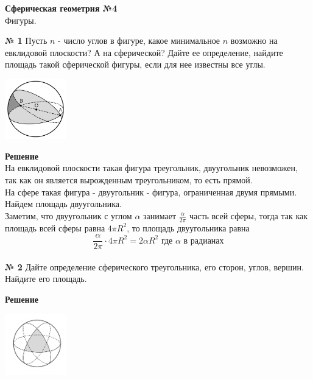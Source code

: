 


    \begin{center}
        \textbf{Сферическая геометрия №4}\\
        Фигуры.
    \end{center}


    \textbf{№ 1}
    Пусть $n$ - число углов в фигуре, какое минимальное $n$ возможно на евклидовой плоскости?
    А на сферической?
    Дайте ее определение, найдите площадь такой сферической фигуры, если для нее известны все углы.

    \begin{center}
        \includegraphics[width=0.2\textwidth]{images/Frame 52}\\
    \end{center}
    \textbf{Решение}\\
    На евклидовой плоскости такая фигура треугольник,
    двуугольник невозможен, так как он является вырожденным треугольником, то есть прямой.\\

    На сфере такая фигура - двуугольник - фигура, ограниченная двумя прямыми.\\

    Найдем площадь двуугольника.\\
    Заметим, что двуугольник с углом $\alpha$ занимает $\frac{\alpha}{2\pi}$ часть всей сферы,
    тогда так как площадь всей сферы равна $4\pi R^2$, то площадь двуугольника равна
    \[
        \frac{\alpha}{2\pi}\cdot 4\pi R^2 = 2\alpha R^2\text{ где $\alpha$ в радианах}
    \]\\


    \textbf{№ 2}
    Дайте определение сферического треугольника, его сторон, углов, вершин.
    Найдите его площадь.

    \textbf{Решение}\\
    \begin{center}
        \includegraphics[width=0.2\textwidth]{images/Frame 23}\\
    \end{center}

